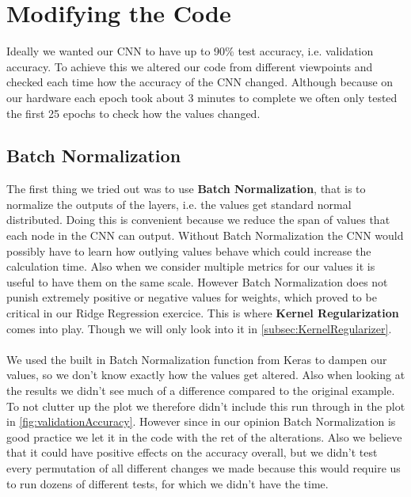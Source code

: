 \documentclass{article}
\begin{document}
	\section{Modifying the Code}
	\label{sec:ModifyingTheCode}
	Ideally we wanted our CNN to have up to 90\% test accuracy, i.e. validation accuracy. To achieve this we altered our code from different viewpoints and checked each time how the accuracy of the CNN changed. Although because on our hardware each epoch took about 3 minutes to complete we often only tested the first 25 epochs to check how the values changed. \\
	
	\subsection{Batch Normalization}
	\label{subsec:BatchNormalization}
	The first thing we tried out was to use \textbf{Batch Normalization}, that is to normalize the outputs of the layers, i.e. the values get standard normal distributed. Doing this is convenient because we reduce the span of values that each node in the CNN can output. Without Batch Normalization the CNN would possibly have to learn how outlying values behave which could increase the calculation time. Also when we consider multiple metrics for our values it is useful to have them on the same scale. However Batch Normalization does not punish extremely positive or negative values for weights, which proved to be critical in our Ridge Regression exercice. This is where \textbf{Kernel Regularization} comes into play. Though we will only look into it in \autoref{subsec:KernelRegularizer}. \\
	\\
	We used the built in Batch Normalization function from Keras to dampen our values, so we don't know exactly how the values get altered. Also when looking at the results we didn't see much of a difference compared to the original example. To not clutter up the plot we therefore didn't include this run through in the plot in \autoref{fig:validationAccuracy}. 
	However since in our opinion Batch Normalization is good practice we let it in the code with the ret of the alterations. Also we believe that it could have positive effects on the accuracy overall, but we didn't test every permutation of all different changes we made because this would require us to run dozens of different tests, for which we didn't have the time.
	 
\end{document}
